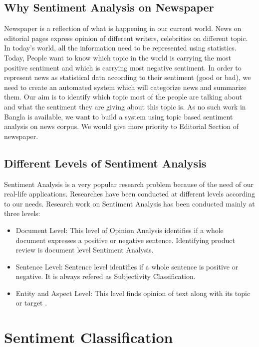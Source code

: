 \documentclass[a4paper,12pt]{report}
\begin{document}
\section{Why Sentiment Analysis on Newspaper}
Newspaper is a reflection of what is happening in our current world. News on editorial pages express opinion of different writers, celebrities on different topic. 
In today’s world, all the information need to be represented using statistics. Today, People want to know which topic in the world is carrying the most positive sentiment and which is carrying most negative sentiment.  In order to represent news as statistical data according to their sentiment (good or bad), we need to create an automated system which will categorize news and summarize them. Our aim is to identify which topic most of the people are talking about and what the sentiment they are giving about this topic is. As no such work in Bangla is available, we want to build a system using topic based sentiment analysis on news corpus. We would give more priority to Editorial Section of newspaper. 

\section{Different Levels of Sentiment Analysis}
Sentiment Analysis is a very popular research problem because of the need of our real-life applications. Researches have been conducted at different levels according to our needs. Research work on Sentiment Analysis has been conducted mainly at three levels:
\begin{itemize}
    \item Document Level: This level of Opinion Analysis identifies if a whole document expresses a positive or negative sentence. Identifying product review is document level Sentiment Analysis. \citep{jagtapsentence}
    \item Sentence Level: Sentence level identifies if a whole sentence is positive or negative. It is always refered as Subjectivity Classification.\citep{das2009subjectivity}
    \item Entity and Aspect Level: This level finds opinion of text along with its topic or target  \citep{das2010topic}.
\end{itemize}


\chapter{  Sentiment Classification}
\end{document}
